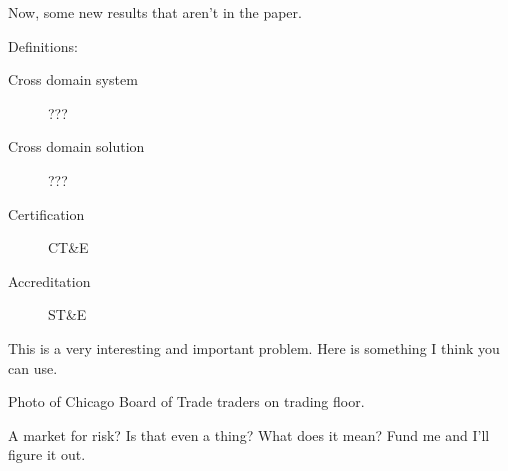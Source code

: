 \documentclass{beamer}
\begin{document}
Now, some new results that aren't in the paper.

Definitions:
\begin{description}
	\item[Cross domain system] ???
	\item[Cross domain solution] ???
	\item[Certification] CT\&E
	\item[Accreditation] ST\&E
\end{description}


\begin{frame}
	This is a very interesting and important problem.  Here is something I think you can use.

	Photo of Chicago Board of Trade traders on trading floor.

	A market for risk?  Is that even a thing?  What does it mean?  Fund me and I'll figure it out.
\end{frame}
\end{document}
